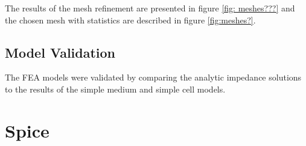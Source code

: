 \par The results of the mesh refinement are presented in figure \ref{fig: meshes???} and the chosen mesh with statistics are described in figure \ref{fig:meshes?}.


\subsection{Model Validation}
\par The FEA models were validated by comparing the analytic impedance solutions to the results of the simple medium and simple cell models. 


\section{Spice}